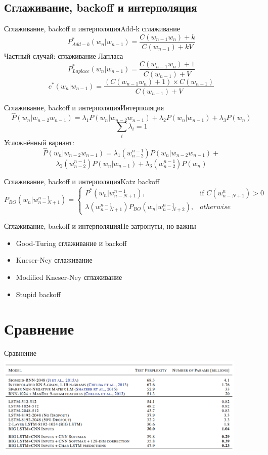 \documentclass[10pt]{beamer}
\begin{document}
\subsection{Сглаживание, backoff и интерполяция}
\begin{frame}{Сглаживание, backoff и интерполяция}{Add-k сглаживание}
$$P_{Add-k}^{*}(w_n|w_{n-1}) = \frac{C(w_{n-1}w_n) + k}{C(w_{n-1})+kV}$$
Частный случай: сглаживание Лапласа
$$P_{Laplace}^{*}(w_n|w_{n-1}) = \frac{C(w_{n-1}w_n) + 1}{C(w_{n-1})+V}$$
$$c^{*}(w_n|w_{n-1}) =\frac{(C(w_{n-1}w_n)+1) \times C(w_{n-1})}{C(w_{n-1})+V}$$
\end{frame}

\begin{frame}{Сглаживание, backoff и интерполяция}{Интерполяция}
$$\hat{P}(w_n|w_{n-2}w_{n-1}) = \lambda_1 P(w_n|w_{n-2}w_{n-1}) + \lambda_2 P(w_n|w_{n-1}) + \lambda_3 P(w_n)$$
$$\sum_i \lambda_i = 1$$
Усложнённый вариант:
$$\hat{P}(w_n|w_{n-2}w_{n-1}) = \lambda_1(w_{n-2}^{n-1}) P(w_n|w_{n-2}w_{n-1}) + $$
$$ \lambda_2(w_{n-2}^{n-1}) P(w_n|w_{n-1}) + \lambda_3(w_{n-2}^{n-1}) P(w_n)$$
\end{frame}

\begin{frame}{Сглаживание, backoff и интерполяция}{Katz backoff}
$$P_{BO}(w_n|w_{n-N+1}^{n-1}) = \begin{cases} P^{*}(w_n|w_{n-N+1}^{n-1}), & \mbox{if } C(w_{n-N+1}^n) > 0 \\ \lambda(w_{n-N+1}^{n-1}) P_{BO}(w_n|w_{n-N+2}^{n-1}), & otherwise \end{cases}$$
\end{frame}

\begin{frame}{Сглаживание, backoff и интерполяция}{Не затронуты, но важны}
\begin{itemize}
    \item Good-Turing сглаживание и backoff
    \item Kneser-Ney сглаживание
    \item Modified Kneser-Ney сглаживание
    \item Stupid backoff
\end{itemize}
\end{frame}

\section{Сравнение}
\begin{frame}{Сравнение}
 \includegraphics[width=12cm, height=5cm]{ComputationalLinguistics/Pictures/lm-stat.png}
\end{frame}
\end{document}
